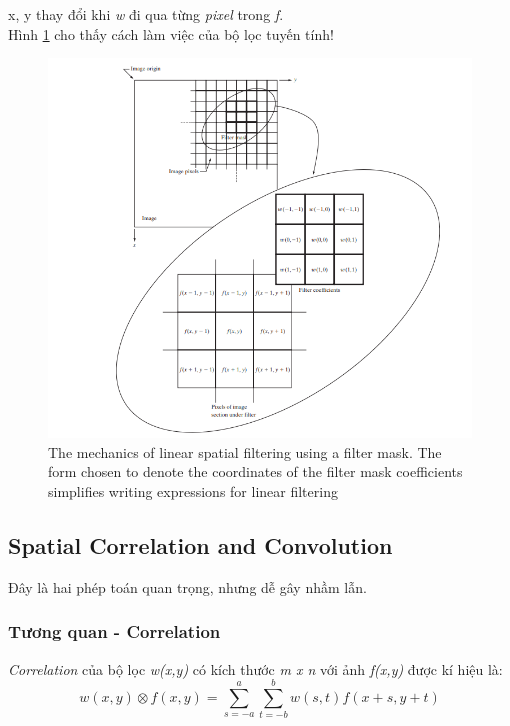 \documentclass{article}
\begin{document}
    x, y thay đổi khi \textit{w} đi qua từng \textit{pixel} trong \textit{f}.
    \\Hình \ref{fig1} cho thấy cách làm việc của bộ lọc tuyến tính!
    \begin{figure}
        \includegraphics[width = \linewidth]{figure3_28.png}
        \caption{The mechanics of linear spatial filtering using a filter mask. The form chosen to denote the coordinates of the filter mask coefficients simplifies writing expressions for linear filtering}
        \label{fig1}
    \end{figure}
    \newpage
    \subsection{Spatial Correlation and Convolution}
    Đây là hai phép toán quan trọng, nhưng dễ gây nhầm lẫn.
        \subsubsection{Tương quan - Correlation}
        \textit{Correlation } của bộ lọc \textit{w(x,y)} có kích thước \textit{m x n} với ảnh \textit{f(x,y)} được kí hiệu là:
        $$w(x,y) \otimes f(x,y) = \sum_{s=-a}^{a}\sum_{t=-b}^{b} w(s,t)f(x+s,y+t)$$
\end{document}
